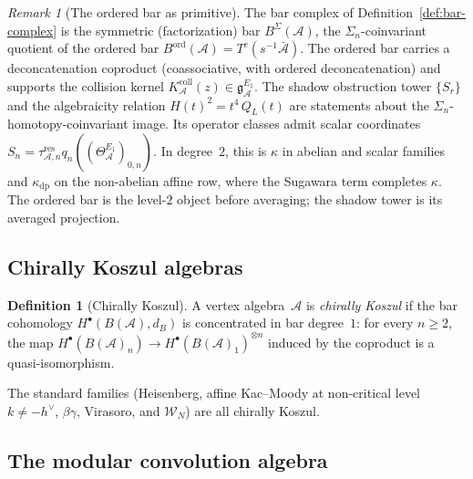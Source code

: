 \documentclass[11pt,reqno]{amsart}
\theoremstyle{definition}
\newtheorem{definition}[theorem]{Definition}
\theoremstyle{remark}
\newtheorem{remark}[theorem]{Remark}
\newcommand{\cA}{\mathcal{A}}
\newcommand{\cW}{\mathcal{W}}
\numberwithin{equation}{section}
\begin{document}
\begin{remark}[The ordered bar as
primitive]\label{rem:ordered-bar}
The bar complex of Definition~\ref{def:bar-complex} is the
symmetric (factorization) bar $B^\Sigma(\cA)$, the
$\Sigma_n$-coinvariant quotient of the ordered bar
$B^{\mathrm{ord}}(\cA) = T^c(s^{-1}\bar{\cA})$. The
ordered bar carries a deconcatenation coproduct
(coassociative, with ordered deconcatenation) and supports the
collision kernel $K_\cA^{\mathrm{coll}}(z)
\in\mathfrak{g}^{E_1}_\cA$. The shadow
obstruction tower $\{S_r\}$ and the algebraicity relation
$H(t)^2 = t^4\, Q_L(t)$ are statements about the
$\Sigma_n$-homotopy-coinvariant image. Its operator classes admit
scalar coordinates
$S_n=\tau_{\cA,n}^{\mathrm{res}}q_n((\Theta_\cA^{E_1})_{0,n})$.
In degree~$2$, this is $\kappa$ in abelian and scalar families and
$\kappa_{\mathrm{dp}}$ on the non-abelian affine row, where the
Sugawara term completes $\kappa$. The ordered bar is the level-$2$ object before averaging; the
shadow tower is its averaged projection.
\end{remark}

\subsection{Chirally Koszul algebras}\label{subsec:koszul}

\begin{definition}[Chirally
Koszul]\label{def:chirally-koszul}
A vertex algebra~$\cA$ is \emph{chirally Koszul} if the bar
cohomology $H^\bullet(B(\cA), d_B)$ is concentrated in bar
degree~$1$: for every $n \ge 2$, the map
$H^\bullet(B(\cA)_n) \to H^\bullet(B(\cA)_1)^{\otimes n}$
induced by the coproduct is a quasi-isomorphism.
\end{definition}

The standard families (Heisenberg, affine Kac--Moody at
non-critical level $k \ne -h^\vee$, $\beta\gamma$,
Virasoro, and $\cW_N$) are all chirally Koszul.

\subsection{The modular convolution algebra}
\label{subsec:convolution}
\end{document}
